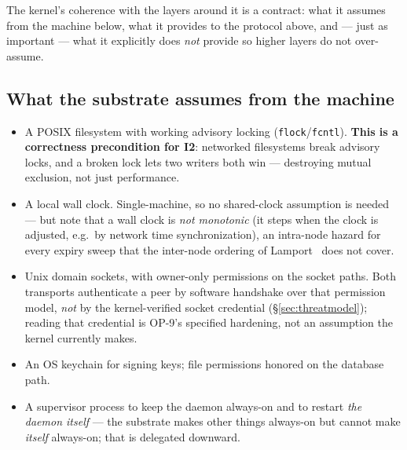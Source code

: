 \documentclass[11pt,a4paper]{article}
\theoremstyle{definition}
\theoremstyle{remark}
\begin{document}
The kernel's coherence with the layers around it is a contract: what it assumes
from the machine below, what it provides to the protocol above, and --- just as
important --- what it explicitly does \emph{not} provide so higher layers do not
over-assume.

\subsection{What the substrate assumes from the machine}
\begin{itemize}[leftmargin=1.4em]
  \item A POSIX filesystem with working advisory locking (\texttt{flock}/\texttt{fcntl}).
  \textbf{This is a correctness precondition for I2}: networked filesystems break
  advisory locks, and a broken lock lets two writers both win --- destroying mutual
  exclusion, not just performance.
  \item A local wall clock. Single-machine, so no shared-clock assumption is needed
  --- but note that a wall clock is \emph{not monotonic} (it steps when the clock is
  adjusted, e.g.\ by network time synchronization), an intra-node hazard for every
  expiry sweep that the inter-node ordering of Lamport~\cite{lamport1978} does not
  cover.
  \item Unix domain sockets, with owner-only permissions on the socket paths. Both
  transports authenticate a peer by software handshake over that permission model,
  \emph{not} by the kernel-verified socket credential (\S\ref{sec:threatmodel});
  reading that credential is OP-9's specified hardening, not an assumption the
  kernel currently makes.
  \item An OS keychain for signing keys; file permissions honored on the database
  path.
  \item A supervisor process to keep the daemon always-on and to restart \emph{the
  daemon itself} --- the substrate makes other things always-on but cannot make
  \emph{itself} always-on; that is delegated downward.
\end{itemize}
\end{document}
